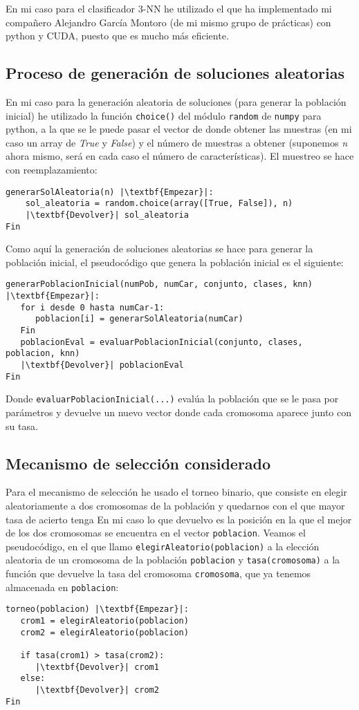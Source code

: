 \documentclass[12pt]{article}
\begin{document}
En mi caso para el clasificador 3-NN he utilizado el que ha implementado mi compañero Alejandro García Montoro (de mi mismo grupo de prácticas) con python y CUDA, puesto que es mucho más eficiente.

\subsection{Proceso de generación de soluciones aleatorias}
En mi caso para la generación aleatoria de soluciones (para generar la población inicial) he utilizado la función \texttt{choice()} del módulo \texttt{random} de \texttt{numpy} para python, a la que se le puede pasar el vector de donde obtener las muestras (en mi caso un array de \textit{True} y \textit{False}) y el número de muestras a obtener (suponemos \textit{n} ahora mismo, será en cada caso el número de características). El muestreo se hace con reemplazamiento:
\begin{lstlisting}
generarSolAleatoria(n) |\textbf{Empezar}|:
	sol_aleatoria = random.choice(array([True, False]), n)
	|\textbf{Devolver}| sol_aleatoria
Fin
\end{lstlisting}

Como aquí la generación de soluciones aleatorias se hace para generar la población inicial, el pseudocódigo que genera la población inicial es el siguiente:
\begin{lstlisting}
generarPoblacionInicial(numPob, numCar, conjunto, clases, knn) |\textbf{Empezar}|:
   for i desde 0 hasta numCar-1:
      poblacion[i] = generarSolAleatoria(numCar)
   Fin
   poblacionEval = evaluarPoblacionInicial(conjunto, clases, poblacion, knn)
   |\textbf{Devolver}| poblacionEval
Fin
\end{lstlisting}

Donde \texttt{evaluarPoblacionInicial(...)} evalúa la población que se le pasa por parámetros y devuelve un nuevo vector donde cada cromosoma aparece junto con su tasa.

\subsection{Mecanismo de selección considerado}
Para el mecanismo de selección he usado el torneo binario, que consiste en elegir aleatoriamente a dos cromosomas de la población y quedarnos con el que mayor tasa de acierto tenga En mi caso lo que devuelvo es la posición en la que el mejor de los dos cromosomas se encuentra en el vector \texttt{poblacion}. Veamos el pseudocódigo, en el que llamo \texttt{elegirAleatorio(poblacion)} a la elección aleatoria de un cromosoma de la población \texttt{poblacion} y \texttt{tasa(cromosoma)} a la función que devuelve la tasa del cromosoma \texttt{cromosoma}, que ya tenemos almacenada en \texttt{poblacion}:
\begin{lstlisting}
torneo(poblacion) |\textbf{Empezar}|:
   crom1 = elegirAleatorio(poblacion)
   crom2 = elegirAleatorio(poblacion)
   
   if tasa(crom1) > tasa(crom2):
      |\textbf{Devolver}| crom1
   else:
      |\textbf{Devolver}| crom2
Fin
\end{lstlisting}
\end{document}
